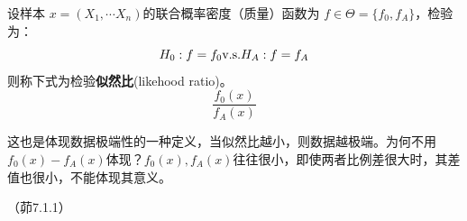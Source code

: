 \begin{definition}[似然比]
    设样本 $x=(X_1,\cdots X_n)$的联合概率密度（质量）函数为 $f \in \Theta=\{ f_0, f_A \}$，检验为：
    \[ H_0: f = f_0 \text{v.s.} H_A: f=f_A \]
    则称下式为检验\textbf{似然比}(likehood ratio)。
    \[ \frac{f_0(x)}{f_A(x)} \]
\end{definition}

这也是体现数据极端性的一种定义，当似然比越小，则数据越极端。为何不用 $f_0(x)-f_A(x)$体现？$f_0(x), f_A(x)$往往很小，即使两者比例差很大时，其差值也很小，不能体现其意义。

\begin{theorem}

\end{theorem}


\begin{problemset}[错题记录]
    \item （茆7.1.1）
    \item
\end{problemset}
